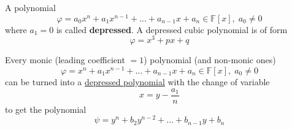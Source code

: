   \begin{definition}
    \label{def:depressed}
    A polynomial 
    \begin{equation}
      \varphi = a_0 x^n + a_1 x^{n-1} + ... + a_{n-1} x + a_n \in \mathbb{F}[x], \; a_0 \neq 0
    \end{equation}
    where $a_1 = 0$ is called \textbf{depressed}. A depressed cubic polynomial is of form
    \begin{equation}
      \varphi = x^3 + p x + q
    \end{equation}
  \end{definition}

  \begin{theorem}
    \label{thm:monic-leading-coefficient-polynomial-non}
    Every monic (leading coefficient $=1$) polynomial (and non-monic ones) 
    \begin{equation}
      \varphi = x^n + a_1 x^{n-1} + ... + a_{n-1} x + a_n \in \mathbb{F}[x], \; a_0 \neq 0
    \end{equation}
    can be turned into a \hyperref[def:depressed]{depressed polynomial} with the change of variable
    \begin{equation}
      x = y - \frac{a_1}{n}
    \end{equation}
    to get the polynomial 
    \begin{equation}
      \psi = y^n + b_2 y^{n-2} + ... + b_{n-1} y + b_n
    \end{equation}
  \end{theorem}

